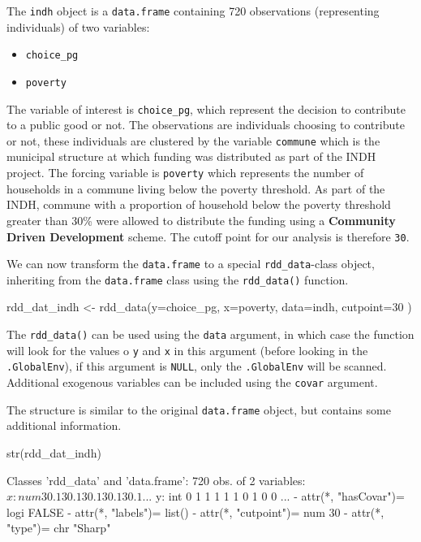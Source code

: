 \documentclass[article]{jss}
\begin{document}
The \texttt{indh} object is a \texttt{data.frame} containing 720
observations (representing individuals) of two variables:

\begin{itemize}
\itemsep1pt\parskip0pt
\item
  \texttt{choice\_pg}
\item
  \texttt{poverty}
\end{itemize}

The variable of interest is \texttt{choice\_pg}, which represent the
decision to contribute to a public good or not. The observations are
individuals choosing to contribute or not, these individuals are
clustered by the variable \texttt{commune} which is the municipal
structure at which funding was distributed as part of the INDH project.
The forcing variable is \texttt{poverty} which represents the number of
households in a commune living below the poverty threshold. As part of
the INDH, commune with a proportion of household below the poverty
threshold greater than 30\% were allowed to distribute the funding using
a \textbf{Community Driven Development} scheme. The cutoff point for our
analysis is therefore \texttt{30}.

We can now transform the \texttt{data.frame} to a special
\texttt{rdd\_data}-class object, inheriting from the \texttt{data.frame}
class using the \texttt{rdd\_data()} function.

\begin{CodeChunk}
\begin{CodeInput}
rdd_dat_indh <- rdd_data(y=choice_pg,
                         x=poverty,
                         data=indh,
                         cutpoint=30 )
\end{CodeInput}
\end{CodeChunk}

The \texttt{rdd\_data()} can be used using the \texttt{data} argument,
in which case the function will look for the values o \texttt{y} and
\texttt{x} in this argument (before looking in the \texttt{.GlobalEnv}),
if this argument is \texttt{NULL}, only the \texttt{.GlobalEnv} will be
scanned. Additional exogenous variables can be included using the
\texttt{covar} argument.

The structure is similar to the original \texttt{data.frame} object, but
contains some additional information.

\begin{CodeChunk}
\begin{CodeInput}
str(rdd_dat_indh)
\end{CodeInput}
\begin{CodeOutput}
Classes 'rdd_data' and 'data.frame':    720 obs. of  2 variables:
 $ x: num  30.1 30.1 30.1 30.1 30.1 ...
 $ y: int  0 1 1 1 1 1 0 1 0 0 ...
 - attr(*, "hasCovar")= logi FALSE
 - attr(*, "labels")= list()
 - attr(*, "cutpoint")= num 30
 - attr(*, "type")= chr "Sharp"
\end{CodeOutput}
\end{CodeChunk}
\end{document}
